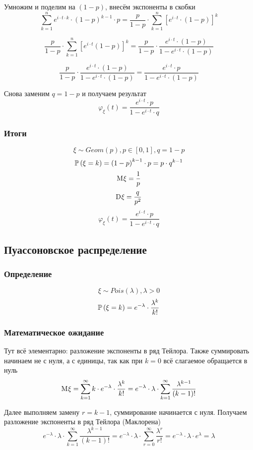 Умножим и поделим на $\left( 1-p \right)$, внесём экспоненты в скобки
$$\sum_{k=1}^n e^{i \cdot t \cdot k}
        \cdot \left( 1-p \right)^{k-1} \cdot p
    = \frac{p}{1-p} \cdot
        \sum_{k=1}^n \left[ e^{i \cdot t} \cdot \left( 1-p \right) \right]^k$$

$$\frac{p}{1-p} \cdot
    \sum_{k=1}^n \left[ e^{i \cdot t} \left( 1-p \right) \right]^k
    = \frac{p}{1-p} \cdot \frac{e^{i \cdot t} \cdot \left( 1-p \right)}
        {1 - e^{i \cdot t} \cdot \left( 1-p \right)}
    $$

$$\frac{p}{1-p} \cdot \frac{e^{i \cdot t} \cdot \left( 1-p \right)}
        {1 - e^{i \cdot t} \cdot \left( 1-p \right)}
    = \frac{e^{i \cdot t} \cdot p}
        {1 - e^{i \cdot t} \cdot \left( 1-p \right)}$$

Снова заменим $q=1-p$ и получаем результат
$$\varphi_{\xi}\left( t \right) = \frac{e^{i \cdot t} \cdot p}
        {1 - e^{i \cdot t} \cdot q}$$
\subsubsection{Итоги}
$$\xi \sim Geom\left( p \right), p \in \left[ 0,1 \right], q=1-p$$
$$\mathbb{P}\left( \xi=k \right) = \left( 1-p \right)^{k-1} \cdot p = p \cdot q^{k-1}$$
$$\mathrm{M}_{} \xi = \frac{1}{p}$$
$$\mathrm{D}_{} \xi = \frac{q}{p^2}$$
$$\varphi_{\xi}\left( t \right) = \frac{e^{i \cdot t} \cdot p}
        {1 - e^{i \cdot t} \cdot q}$$

\subsection{Пуассоновское распределение}
\subsubsection{Определение}
$$\xi \sim Pois\left( \lambda \right), \lambda > 0$$
$$\mathbb{P}\left( \xi=k \right) = e^{-\lambda} \cdot \frac{\lambda^k}{k!}$$
\subsubsection{Математическое ожидание}
Тут всё элементарно: разложение экспоненты в ряд Тейлора.
Также суммировать начинаем не с нуля, а с единицы,
так как при $k=0$ всё слагаемое обращается в нуль
$$\mathrm{M}_{} \xi
    = \sum_{k=1}^\infty k \cdot e^{-\lambda} \cdot \frac{\lambda^k}{k!}
    = e^{-\lambda} \cdot \lambda
        \cdot \sum_{k=1}^\infty \frac{\lambda^{k-1}}{\left( k-1 \right)!}$$

Далее выполняем замену $r=k-1$, суммирование начинается с нуля.
Получаем разложение экспоненты в ряд Тейлора (Маклорена)
$$e^{-\lambda} \cdot \lambda
    \cdot \sum_{k=1}^\infty \frac{\lambda^{k-1}}{\left( k-1 \right)!}
    = e^{-\lambda} \cdot \lambda
        \cdot \sum_{r=0}^\infty \frac{\lambda^r}{r!}
    = e^{-\lambda} \cdot \lambda \cdot e^\lambda
    = \lambda$$
